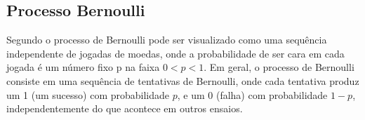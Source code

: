 











\subsection{Processo Bernoulli}

Segundo \cite{bertsekas2008} o processo de Bernoulli pode ser visualizado como uma sequência independente de jogadas de moedas, onde a probabilidade de ser cara em cada jogada é um número fixo p na faixa $0 < p < 1$. Em geral, o processo de Bernoulli consiste em uma sequência de tentativas de Bernoulli, onde cada tentativa produz um 1 (um sucesso) com probabilidade $p$, e um 0 (falha) com probabilidade $1 - p$, independentemente do que acontece em outros ensaios.


